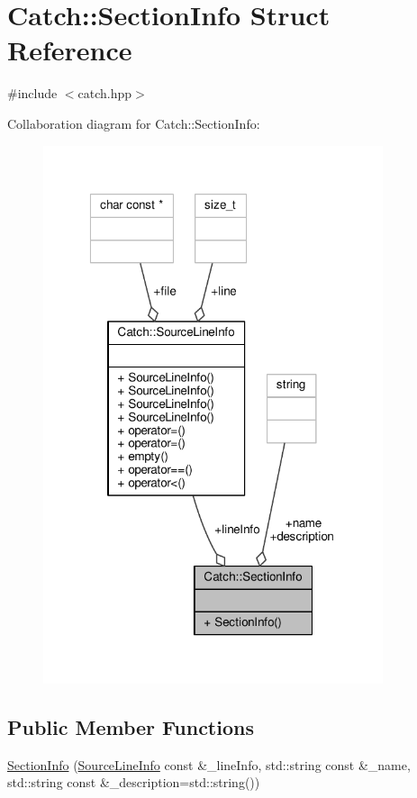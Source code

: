 \hypertarget{struct_catch_1_1_section_info}{\section{Catch\-:\-:Section\-Info Struct Reference}
\label{struct_catch_1_1_section_info}
}


{\ttfamily \#include $<$catch.\-hpp$>$}



Collaboration diagram for Catch\-:\-:Section\-Info\-:
\nopagebreak
\begin{figure}[H]
\begin{center}
\leavevmode
\includegraphics[width=283pt]{struct_catch_1_1_section_info__coll__graph}
\end{center}
\end{figure}
\subsection*{Public Member Functions}
\begin{DoxyCompactItemize}
\item 
\hyperlink{struct_catch_1_1_section_info_a27aff3aaf8b6611f3651b17111a272c6}{Section\-Info} (\hyperlink{struct_catch_1_1_source_line_info}{Source\-Line\-Info} const \&\-\_\-line\-Info, std\-::string const \&\-\_\-name, std\-::string const \&\-\_\-description=std\-::string())
\end{DoxyCompactItemize}
